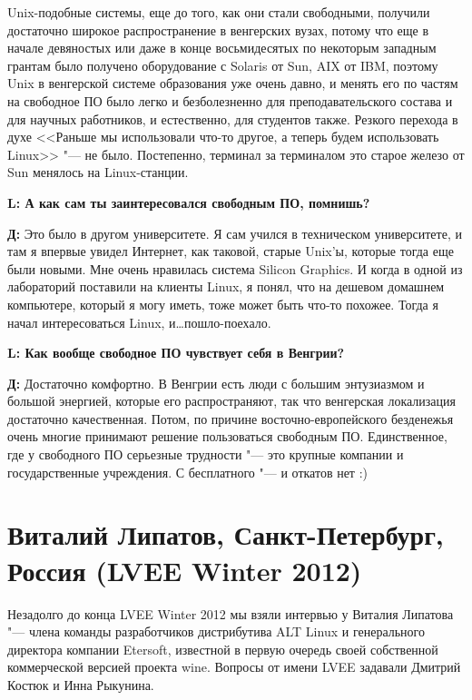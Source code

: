 \documentclass[10pt, a5paper]{article}
\begin{document}
Unix-подобные системы, еще до того, как они стали свободными, получили достаточно широкое распространение в венгерских вузах, потому что еще в начале девяностых или даже в конце восьмидесятых по некоторым западным грантам было получено оборудование с Solaris от Sun, AIX от IBM, поэтому Unix в венгерской системе образования уже очень давно, и менять его по частям на свободное ПО было легко и безболезненно для преподавательского состава и для научных работников, и естественно, для студентов также. Резкого перехода в духе <<Раньше мы использовали что-то другое, а теперь будем использовать Linux>> "--- не было. Постепенно, терминал за терминалом это старое железо от Sun менялось на Linux-станции.

{\noindent \bf L: А как сам ты заинтересовался свободным ПО, помнишь?}

{\noindent \bf Д:}  Это было в другом университете. Я сам учился в техническом университете, и там я впервые увидел Интернет, как таковой, старые Unix'ы, которые тогда еще были новыми. Мне очень нравилась система Silicon Graphics. И когда в одной из лабораторий поставили на клиенты Linux, я понял, что на дешевом домашнем компьютере, который я могу иметь, тоже может быть что-то похожее. Тогда я начал интересоваться Linux, и\ldots пошло-поехало.

{\noindent \bf L: Как вообще свободное ПО чувствует себя в Венгрии?}

{\noindent \bf Д:} Достаточно комфортно. В Венгрии есть люди с большим энтузиазмом и большой энергией, которые его распространяют, так что венгерская локализация  достаточно качественная. Потом, по причине восточно-европейского безденежья очень многие принимают решение пользоваться свободным ПО. Единственное, где у свободного ПО серьезные трудности "--- это крупные компании и государственные учреждения. С бесплатного "--- и откатов нет :)

\section[Виталий Липатов, Санкт-Петербург, Россия (LVEE Winter 2012)]{Виталий Липатов, Санкт-Петербург, \linebreak Россия (LVEE Winter 2012)}

Незадолго до конца LVEE Winter 2012 мы взяли интервью у Виталия Липатова "--- члена команды разработчиков  дистрибутива ALT Linux и генерального директора компании Etersoft, известной в первую очередь своей собственной коммерческой версией проекта wine. Вопросы от имени LVEE задавали Дмитрий Костюк и Инна Рыкунина.
\end{document}
